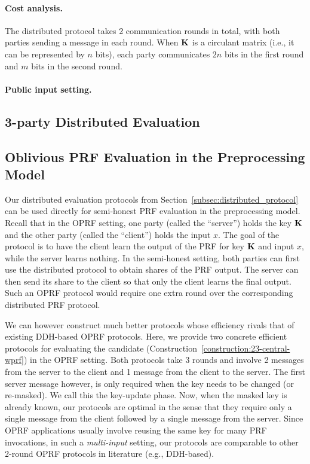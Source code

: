 \paragraph{Cost analysis.}
The distributed protocol takes 2 communication rounds in total, with both parties sending a message in each round. When $\mat{K}$ is a circulant matrix (i.e., it can be represented by $n$ bits), each party communicates $2n$ bits in the first round and $m$ bits in the second round.


\paragraph{Public input setting.}

\subsection{3-party Distributed Evaluation}
\label{subsec:3party_protocol}






\subsection{Oblivious PRF Evaluation in the Preprocessing Model}
\label{subsec:oprf_protocol}
Our distributed evaluation protocols from Section~\ref{subsec:distributed_protocol} can be used directly for semi-honest PRF evaluation in the preprocessing model. Recall that in the OPRF setting, one party (called the ``server'') holds the key $\mat{K}$ and the other party (called the ``client'') holds the input $x$. The goal of the protocol is to have the client learn the output of the PRF for key $\mat{K}$ and input $x$, while the server learns nothing. In the semi-honest setting, both parties can first use the distributed protocol to obtain shares of the PRF output. The server can then send its share to the client so that only the client learns the final output. Such an OPRF protocol would require one extra round over the corresponding distributed PRF protocol.

We can however construct much better protocols whose efficiency rivals that of existing DDH-based OPRF protocols. Here, we provide two concrete efficient protocols for evaluating the \ttwPRF candidate (Construction~\ref{construction:23-central-wprf}) in the OPRF setting. Both protocols take $3$ rounds and involve 2 messages from the server to the client and 1 message from the client to the server. The first server message however, is only required when the key needs to be changed (or re-masked). We call this the key-update phase. Now, when the masked key is already known, our protocols are optimal in the sense that they require only a single message from the client followed by a single message from the server. Since OPRF applications usually involve reusing the same key for many PRF invocations, in such a \textit{multi-input} setting, our protocols are comparable to other 2-round OPRF protocols in literature (e.g., DDH-based). 

